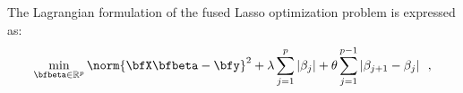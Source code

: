 The Lagrangian formulation of the fused Lasso optimization problem is expressed
as:
\begin{equation}
  \min_{\bfbeta\in\mathbb{R}^p} \norm{\bfX \bfbeta - \bfy}^2 + 
    \lambda \sum_{j=1}^p \left|\beta_{j}\right| + \theta \sum_{j=1}^{p-1} \left| \beta_{j+1} - \beta_j \right|
  \enspace, 
\end{equation}
